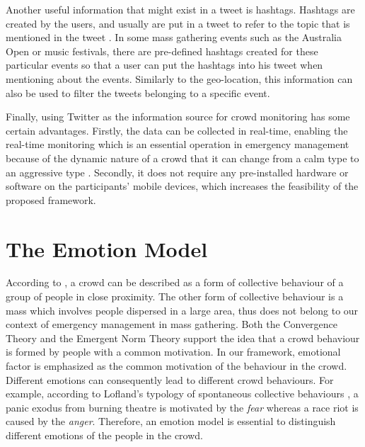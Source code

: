 Another useful information that might exist in a tweet is hashtags. Hashtags are created by the users, and usually are put in a tweet to refer to the topic that is mentioned in the tweet \cite{mohammad2014using}. In some mass gathering events such as the Australia Open or music festivals, there are pre-defined hashtags created for these particular events so that a user can put the hashtags into his tweet when mentioning about the events. Similarly to the geo-location, this information can also be used to filter the tweets belonging to a specific event.

Finally, using Twitter as the information source for crowd monitoring has some certain advantages. Firstly, the data can be collected in real-time, enabling the real-time monitoring which is an essential operation in emergency management because of the dynamic nature of a crowd that it can change from a calm type to an aggressive type \citep{Berlonghi1995}. Secondly, it does not require any pre-installed hardware or software on the participants' mobile devices, which increases the feasibility of the proposed framework.

\section{The Emotion Model}

According to \citet{Kornblum2011}, a crowd can be described as a form of collective behaviour of a group of people in close proximity. The other form of collective behaviour is a mass which involves people dispersed in a large area, thus does not belong to our context of emergency management in mass gathering. Both the Convergence Theory and the Emergent Norm Theory \citep{mcphail1991myth} support the idea that a crowd behaviour is formed by people with a common motivation. In our framework, emotional factor is emphasized as the common motivation of the behaviour in the crowd. Different emotions can consequently lead to different crowd behaviours. For example, according to Lofland's typology of spontaneous collective behaviours \citep{Kornblum2011}, a panic exodus from burning theatre is motivated by the \textit{fear} whereas a race riot is caused by the \textit{anger}. Therefore, an emotion model is essential to distinguish different emotions of the people in the crowd.

